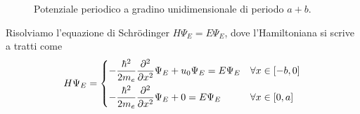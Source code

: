 \begin{example}
\begin{figure}[htbp]
    \caption{Potenziale periodico a gradino unidimensionale di periodo \( a+b \).}
    \label{fig:potenziale_gradino_periodico}
\end{figure}                                                                             
                  
  Risolviamo l'equazione di Schrödinger \( H \Psi_E = E \Psi_E \), dove l'Hamiltoniana si    
  scrive a tratti come
  \begin{equation}                                                                           
      H \Psi_E = \begin{cases}
          \displaystyle -\frac{\hbar^2}{2 m_e} \pdv[2]{}{x} \Psi_E + u_0 \Psi_E = E \Psi_E & 
  \forall x \in [-b, 0] \\[8pt]                                                              
          \displaystyle -\frac{\hbar^2}{2 m_e} \pdv[2]{}{x} \Psi_E + 0 = E \Psi_E & \forall x
   \in [0, a]                                                                                
      \end{cases}
  \end{equation}


\end{example}
